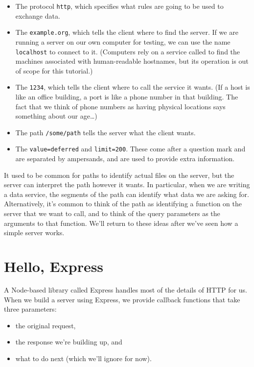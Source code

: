 \begin{itemize}
\item
  The protocol \texttt{http}, which specifies what rules are going to be used to exchange data.
\item
  The  \texttt{example.org}, which tells the client where to find the server.
  If we are running a server on our own computer for testing,
  we can use the name \texttt{localhost} to connect to it.
  (Computers rely on a service called 
  to find the machines associated with human-readable hostnames,
  but its operation is out of scope for this tutorial.)
\item
  The  \texttt{1234}, which tells the client where to call the service it wants.
  (If a host is like an office building, a port is like a phone number in that building.
  The fact that we think of phone numbers as having physical locations
  says something about our age\ldots{})
\item
  The path \texttt{/some/path} tells the server what the client wants.
\item
  The  \texttt{value=deferred} and \texttt{limit=200}.
  These come after a question mark and are separated by ampersands,
  and are used to provide extra information.
\end{itemize}

It used to be common for paths to identify actual files on the server,
but the server can interpret the path however it wants.
In particular,
when we are writing a data service,
the segments of the path can identify what data we are asking for.
Alternatively,
it's common to think of the path as identifying a function on the server that we want to call,
and to think of the query parameters as the arguments to that function.
We'll return to these ideas after we've seen how a simple server works.

\section{Hello, Express}\label{s:server-express}

A Node-based library called Express handles most of the details of HTTP for us.
When we build a server using Express,
we provide callback functions that take three parameters:

\begin{itemize}
\item
  the original request,
\item
  the response we're building up, and
\item
  what to do next (which we'll ignore for now).
\end{itemize}

